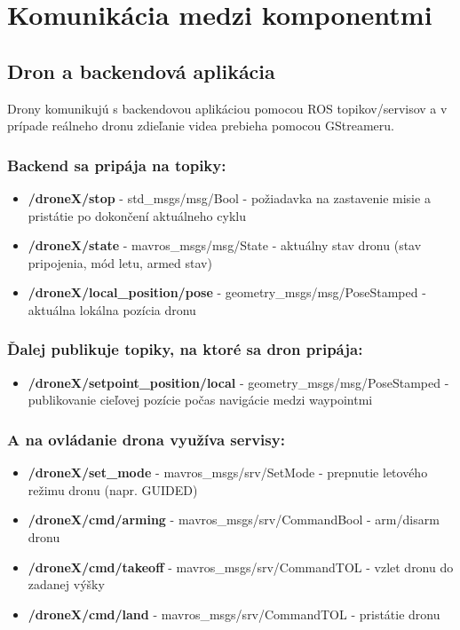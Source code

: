 \documentclass[a4paper,12pt]{article}
\begin{document}
\newpage
\section{Komunikácia medzi komponentmi}

\subsection{Dron a backendová aplikácia}

Drony komunikujú s backendovou aplikáciou pomocou ROS topikov/servisov a v prípade reálneho dronu zdieľanie videa prebieha pomocou GStreameru.

\subsubsection*{Backend sa pripája na topiky:}

\begin{itemize}
    \item \textbf{/droneX/stop} - std\_msgs/msg/Bool - požiadavka na zastavenie misie a pristátie po dokončení aktuálneho cyklu
    \item \textbf{/droneX/state} - mavros\_msgs/msg/State - aktuálny stav dronu (stav pripojenia, mód letu, armed stav)
    \item \textbf{/droneX/local\_position/pose} - geometry\_msgs/msg/PoseStamped - aktuálna lokálna pozícia dronu
\end{itemize}

\subsubsection*{Ďalej publikuje topiky, na ktoré sa dron pripája:}

\begin{itemize}
    \item \textbf{/droneX/setpoint\_position/local} - geometry\_msgs/msg/PoseStamped - publikovanie cieľovej pozície počas navigácie medzi waypointmi
\end{itemize}

\subsubsection*{A na ovládanie drona využíva servisy:}

\begin{itemize}
    \item \textbf{/droneX/set\_mode} - mavros\_msgs/srv/SetMode - prepnutie letového režimu dronu (napr. GUIDED)
    \item \textbf{/droneX/cmd/arming} - mavros\_msgs/srv/CommandBool - arm/disarm dronu
    \item \textbf{/droneX/cmd/takeoff} - mavros\_msgs/srv/CommandTOL - vzlet dronu do zadanej výšky
    \item \textbf{/droneX/cmd/land} - mavros\_msgs/srv/CommandTOL - pristátie dronu
\end{itemize}
\end{document}
